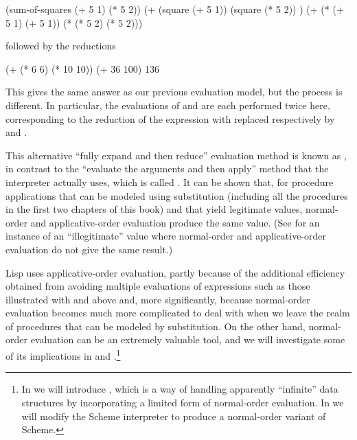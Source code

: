 \begin{codeBlock}
(sum-of-squares (+ 5 1) (* 5 2))
(+   (square (+ 5 1))      (square (* 5 2))  )
(+   (* (+ 5 1) (+ 5 1))   (* (* 5 2) (* 5 2)))
\end{codeBlock}

\noindent
followed by the reductions

\begin{codeBlock}
(+      (* 6 6)      (* 10 10))
(+         36           100)
                136
\end{codeBlock}

\noindent
This gives the same answer as our previous evaluation model, but the process is
different.  In particular, the evaluations of  and 
are each performed twice here, corresponding to the reduction of the expression
 with  replaced respectively by  and
.

This alternative ``fully expand and then reduce'' evaluation method is known as
, in contrast to the ``evaluate the arguments
and then apply'' method that the interpreter actually uses, which is called
.  It can be shown that, for procedure
applications that can be modeled using substitution (including all the
procedures in the first two chapters of this book) and that yield legitimate
values, normal-order and applicative-order evaluation produce the same value.
(See  for an instance of an ``illegitimate'' value where
normal-order and applicative-order evaluation do not give the same result.)

Lisp uses applicative-order evaluation, partly because of the additional
efficiency obtained from avoiding multiple evaluations of expressions such as
those illustrated with  and  above and, more
significantly, because normal-order evaluation becomes much more complicated to
deal with when we leave the realm of procedures that can be modeled by
substitution.  On the other hand, normal-order evaluation can be an extremely
valuable tool, and we will investigate some of its implications in  and .\footnote{In  we will introduce
, which is a way of handling apparently ``infinite''
data structures by incorporating a limited form of normal-order evaluation.  In
 we will modify the Scheme interpreter to produce a
normal-order variant of Scheme.}

